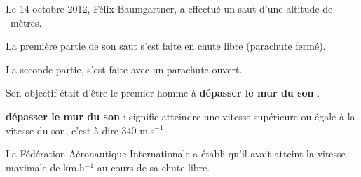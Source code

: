\documentclass[10pt]{article}
\begin{document}
\setlength\parindent{0mm}
\pagestyle{fancy}
\thispagestyle{empty}
    
    
    




\medskip

Le 14 octobre 2012, Félix Baumgartner, a effectué un saut d'une altitude de ~mètres.

La première partie de son saut s'est faite en chute libre (parachute fermé).

La seconde partie, s'est faite avec un parachute ouvert.

Son objectif était d'être le premier homme à \textbf{\og dépasser le mur du son \fg}.

\begin{center}\textbf{\og dépasser le mur du son \fg{}} : signifie atteindre une vitesse supérieure ou égale à la vitesse du son, c'est à dire $340$ m.s$^{-1}$.\end{center}

La Fédération Aéronautique Internationale a établi qu'il avait atteint la vitesse maximale de
 km.h$^{-1}$ au cours de sa chute libre.

\medskip
\end{document}
